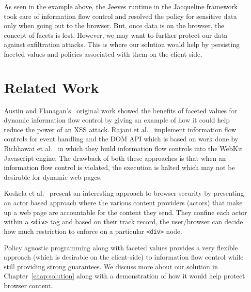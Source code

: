 As seen in the example above, the Jeeves runtime in the Jacqueline framework took
care of information flow control and resolved the policy for sensitive data only
when going out to the browser. But, once data is on the browser, the concept of
facets is lost. However, we may want to further protect our data against exfiltration
attacks. This is where our solution would help by persisting faceted values and
policies associated with them on the client-side.

\section{Related Work}
Austin and Flanagan's~\cite{Faceted} original work showed the benefits of
faceted values for dynamic information flow control by giving an example of how
it could help reduce the power of an XSS attack. Rajani et al.~\cite{eventDOMIFC}
implement information flow controls for event handling and the DOM API which is
based on work done by Bichhawat et al.~\cite{webkitIFC} in which they build information
flow controls into the WebKit Javascript engine. The drawback of both these approaches
is that when an information flow control is violated, the execution is halted which
may not be desirable for dynamic web pages.

Koskela et al.~\cite{SecuringWebContent} present an interesting approach to browser
security by presenting an actor based approach where the various content providers
(actors) that make up a web page are accountable for the content they send. They
confine each actor within a \texttt{<div>} tag and based on their track record,
the user/browser can decide how much restriction to enforce on a particular
\texttt{<div>} node.

Policy agnostic programming along with faceted values provides a very flexible
approach (which is desirable on the client-side) to information flow control while
still providing strong guarantees. We discuss more about our solution
in Chapter~\ref{chap:solution} along with a demonstration of how it would help
protect browser content.
